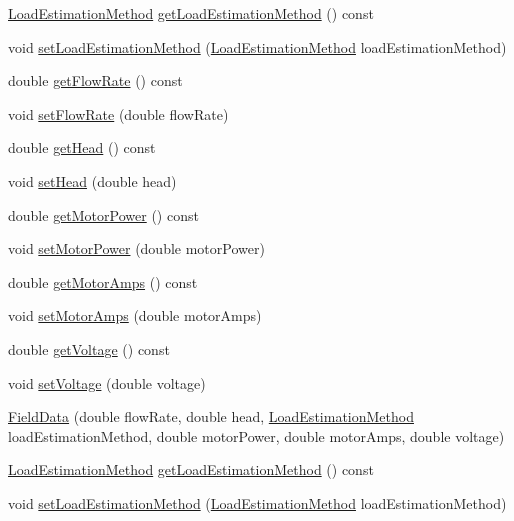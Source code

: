 \begin{DoxyCompactItemize}
\item 
\hyperlink{class_field_data_a424e89914ba5684c01bb269dbe3312fd}{Load\+Estimation\+Method} \hyperlink{class_field_data_ae213fa76dd005d7fd251ef26beecd311}{get\+Load\+Estimation\+Method} () const
\item 
void \hyperlink{class_field_data_a7d1103b1832956d96146cbe26fb34a6d}{set\+Load\+Estimation\+Method} (\hyperlink{class_field_data_a424e89914ba5684c01bb269dbe3312fd}{Load\+Estimation\+Method} load\+Estimation\+Method)
\item 
double \hyperlink{class_field_data_a59b3261a5162b002d7b73a2d35561bd0}{get\+Flow\+Rate} () const
\item 
void \hyperlink{class_field_data_ad25c3e5a76b4e493e82d3f70cc3c0ed9}{set\+Flow\+Rate} (double flow\+Rate)
\item 
double \hyperlink{class_field_data_ac3e8e0b2de226c858b6c92cdb454bd0d}{get\+Head} () const
\item 
void \hyperlink{class_field_data_ac72a4f958930000bab0e2b772ee26711}{set\+Head} (double head)
\item 
double \hyperlink{class_field_data_a3e8e1bf84bbd00b9b52b803147968c81}{get\+Motor\+Power} () const
\item 
void \hyperlink{class_field_data_a078e6b4899e7046008ccc9de59bd0272}{set\+Motor\+Power} (double motor\+Power)
\item 
double \hyperlink{class_field_data_ad2b4fffb00fa7cfa6f69487e1034989a}{get\+Motor\+Amps} () const
\item 
void \hyperlink{class_field_data_a4f9373e8a215853b08bbe6a1915fb1a9}{set\+Motor\+Amps} (double motor\+Amps)
\item 
double \hyperlink{class_field_data_a1e8a55965e6cbd8c7b49c0dd5fbee002}{get\+Voltage} () const
\item 
void \hyperlink{class_field_data_a02735cc6956a3fce97bab645ef15dabc}{set\+Voltage} (double voltage)
\item 
\hyperlink{class_field_data_a33158a88d05e657bd2c8007bae875454}{Field\+Data} (double flow\+Rate, double head, \hyperlink{class_field_data_a424e89914ba5684c01bb269dbe3312fd}{Load\+Estimation\+Method} load\+Estimation\+Method, double motor\+Power, double motor\+Amps, double voltage)
\item 
\hyperlink{class_field_data_a424e89914ba5684c01bb269dbe3312fd}{Load\+Estimation\+Method} \hyperlink{class_field_data_ae213fa76dd005d7fd251ef26beecd311}{get\+Load\+Estimation\+Method} () const
\item 
void \hyperlink{class_field_data_a7d1103b1832956d96146cbe26fb34a6d}{set\+Load\+Estimation\+Method} (\hyperlink{class_field_data_a424e89914ba5684c01bb269dbe3312fd}{Load\+Estimation\+Method} load\+Estimation\+Method)

\end{DoxyCompactItemize}
